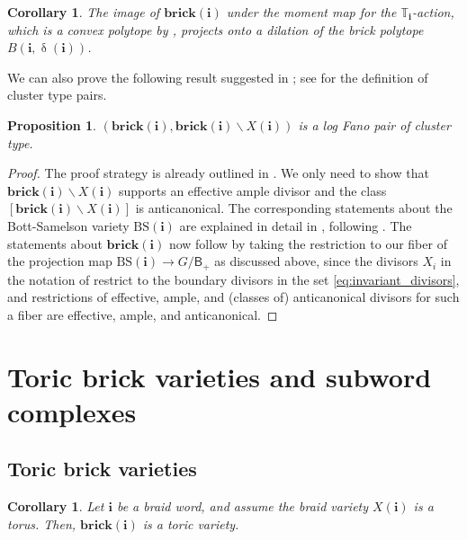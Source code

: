 \documentclass[a4paper, 11pt]{amsart}
\newcommand{\brick}{\mathbf{brick}}
\newcommand{\borel}{\mathsf{B}}
\newcommand{\word}[1]{\mathbf{#1}}
\DeclareMathOperator{\dem}{\delta}
\newcommand{\BS}{\mathrm{BS}}
\newcommand{\dil}[1]{\mathbb{T}_{#1}}
\newtheorem{proposition}[theorem]{Proposition}%
\newtheorem{corollary}[theorem]{Corollary}%
\theoremstyle{definition}
\begin{document}
\begin{corollary}
\label{cor:proj_moment_to_brick_polytopes}
The image of $\brick(\word{i})$ under the moment map for the $\dil{\word{i}}$-action, which is a convex polytope by  \cite{Atiyah, GuilleminSternbergI},  projects onto a dilation of the brick polytope $B(\word{i}, \dem(\word{i}))$.
\end{corollary}

We can also prove the following result suggested in \cite[Remark 5.3]{EFMS}; see \cite{EFM, EFMS} for the definition of  cluster type pairs.

\begin{proposition}
\label{prop:brick_cluster_pair}
$(\brick(\word{i}), \brick(\word{i}) \backslash X(\word{i}))$ is a log Fano pair of cluster type.
\end{proposition}

\begin{proof}
The proof strategy is already outlined in \cite[Remark 5.3]{EFMS}. We only need to show that  $\brick(\word{i}) \backslash X(\word{i})$ supports an effective ample divisor and the class $[\brick(\word{i}) \backslash X(\word{i})]$ is anticanonical. The corresponding statements about the Bott-Samelson variety $\BS(\word{i})$ are explained in detail in \cite[Appendix A]{Anderson}, following \cite{LFT, MR}. The statements about $\brick(\word{i})$ now follow by taking the restriction to our fiber of the projection map $\BS(\word{i}) \to G/\borel_+$ as discussed above, since the divisors $X_i$ in the notation of \cite[Appendix A]{Anderson} restrict to the boundary divisors in the set \eqref{eq:invariant_divisors}, and restrictions of effective, ample, and (classes of) anticanonical divisors for such a fiber are effective, ample, and anticanonical. 
\end{proof}

\section{Toric brick varieties and subword complexes}\label{sec:toric-brick}


\subsection{Toric brick varieties}
\begin{corollary}
\label{cor:torus_implies_toric}
Let $\word{i}$ be a braid word, and assume the braid variety $X(\word{i})$ is a torus. Then, $\brick(\word{i})$ is a toric variety.
\end{corollary}
\end{document}
